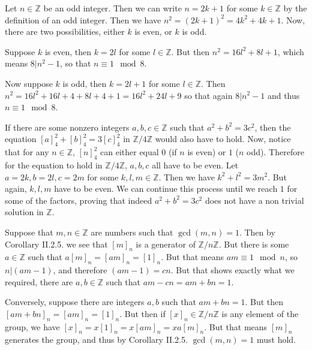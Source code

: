\begin{problem}
\end{problem}

\begin{solution}
	Let $n \in \mathbb{Z}$ be an odd integer. Then we can write $n=2k+1$ for some $k \in \mathbb{Z}$ by the definition of an odd integer. Then we have $n^2=(2k+1)^2=4k^2+4k+1$. Now, there are two possibilities, either $k$ is even, or $k$ is odd.
	
	Suppose $k$ is even, then $k = 2l$ for some $l \in \mathbb{Z}$. But then $n^2=16l^2+8l+1$, which means $8 | n^2-1$, so that $n \equiv 1 \mod 8$.
	
	Now suppose $k$ is odd, then $k=2l+1$ for some $l \in \mathbb{Z}$. Then $n^2=16l^2+16l+4+8l+4+1=16l^2+24l+9$ so that again $8 | n^2 - 1$ and thus $n \equiv 1 \mod 8$.
\end{solution}

\begin{problem}
\end{problem}

\begin{solution}
	If there are some nonzero integers $a, b, c \in \mathbb{Z}$ such that $a^2+b^2=3c^2$, then the equation $[a]^2_4+[b]^2_4=3[c]^2_4$ in $\mathbb{Z}/4\mathbb{Z}$ would also have to hold. Now, notice that for any $n \in \mathbb{Z}$, $[n]^2_4$ can either equal $0$ (if $n$ is even) or $1$ ($n$ odd). Therefore for the equation to hold in $\mathbb{Z}/4\mathbb{Z}$, $a, b, c$ all have to be even. Let $a=2k, b=2l, c=2m$ for some $k,l,m \in \mathbb{Z}$. Then we have $k^2+l^2=3m^2$. But again, $k,l,m$ have to be even. We can continue this process until we reach $1$ for some of the factors, proving that indeed $a^2+b^2=3c^2$ does not have a non trivial solution in $\mathbb{Z}$.
\end{solution}

\begin{problem}
\end{problem}

\begin{solution}
	Suppose that $m,n \in \mathbb{Z}$ are numbers such that $\gcd(m,n) = 1$. Then by Corollary II.2.5. we see that $[m]_n$ is a generator of $\mathbb{Z}/n\mathbb{Z}$. But there is some $a \in \mathbb{Z}$ such that $a[m]_n=[am]_n=[1]_n$. But that means $am \equiv 1 \mod n$, so $n | (am - 1)$, and therefore $(am - 1) = cn$. But that shows exactly what we required, there are $a,b \in \mathbb{Z}$ such that $am - cn = am + bn = 1$.
	
	Conversely, suppose there are integers $a, b$ such that $am+bn=1$. But then $[am+bn]_n=[am]_n=[1]_n$. But then if $[x]_n \in \mathbb{Z}/n\mathbb{Z}$ is any element of the group, we have $[x]_n=x[1]_n=x[am]_n=xa[m]_n$. But that means $[m]_n$ generates the group, and thus by Corollary II.2.5. $\gcd(m,n)=1$ must hold.
\end{solution}

